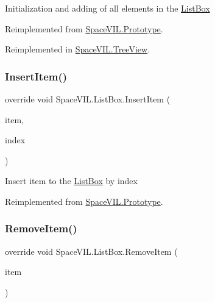 Initialization and adding of all elements in the \mbox{\hyperlink{class_space_v_i_l_1_1_list_box}{List\+Box}} 



Reimplemented from \mbox{\hyperlink{class_space_v_i_l_1_1_prototype_ac3379fe02923ee155b5b0084abf27420}{Space\+V\+I\+L.\+Prototype}}.



Reimplemented in \mbox{\hyperlink{class_space_v_i_l_1_1_tree_view_ac44a1df7d58a35e35842170162645e08}{Space\+V\+I\+L.\+Tree\+View}}.

\mbox{\label{class_space_v_i_l_1_1_list_box_a3d5da8acbfd4f0bb11594b5f4b9001c0}} 
\subsubsection{\texorpdfstring{Insert\+Item()}{InsertItem()}}
{\footnotesize\ttfamily override void Space\+V\+I\+L.\+List\+Box.\+Insert\+Item (\begin{DoxyParamCaption}\item[{\mbox{\hyperlink{interface_space_v_i_l_1_1_core_1_1_i_base_item}{I\+Base\+Item}}}]{item,  }\item[{Int32}]{index }\end{DoxyParamCaption})\hspace{0.3cm}{\ttfamily [virtual]}}



Insert item to the \mbox{\hyperlink{class_space_v_i_l_1_1_list_box}{List\+Box}} by index 



Reimplemented from \mbox{\hyperlink{class_space_v_i_l_1_1_prototype_a9dd004dfa4ca2ea37c21770a24434270}{Space\+V\+I\+L.\+Prototype}}.

\mbox{\label{class_space_v_i_l_1_1_list_box_a3fac47d275899619c3f705c24816ff87}} 
\subsubsection{\texorpdfstring{Remove\+Item()}{RemoveItem()}}
{\footnotesize\ttfamily override void Space\+V\+I\+L.\+List\+Box.\+Remove\+Item (\begin{DoxyParamCaption}\item[{\mbox{\hyperlink{interface_space_v_i_l_1_1_core_1_1_i_base_item}{I\+Base\+Item}}}]{item }\end{DoxyParamCaption})\hspace{0.3cm}{\ttfamily [virtual]}}



